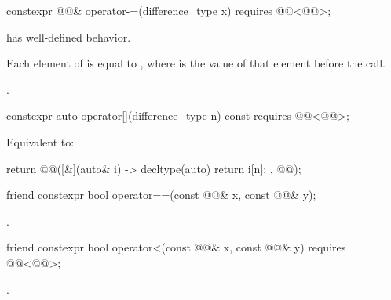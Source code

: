 %
\begin{itemdecl}
constexpr @@& operator-=(difference_type x)
  requires @@<@@>;
\end{itemdecl}

\begin{itemdescr}
\pnum
\expects
{} has well-defined behavior.

\pnum
\ensures
Each element of  is equal to ,
where  is the value of that element before the call.

\pnum
\returns
{}.
\end{itemdescr}

%
\begin{itemdecl}
constexpr auto operator[](difference_type n) const
  requires @@<@@>;
\end{itemdecl}

\begin{itemdescr}
\pnum
\effects
Equivalent to:
\begin{codeblock}
return @@([&](auto& i) -> decltype(auto) { return i[n]; }, @@);
\end{codeblock}
\end{itemdescr}

%
\begin{itemdecl}
friend constexpr bool operator==(const @@& x, const @@& y);
\end{itemdecl}

\begin{itemdescr}
\pnum
\returns
{}.
\end{itemdescr}

%
\begin{itemdecl}
friend constexpr bool operator<(const @@& x, const @@& y)
  requires @@<@@>;
\end{itemdecl}

\begin{itemdescr}
\pnum
\returns
{}.
\end{itemdescr}

